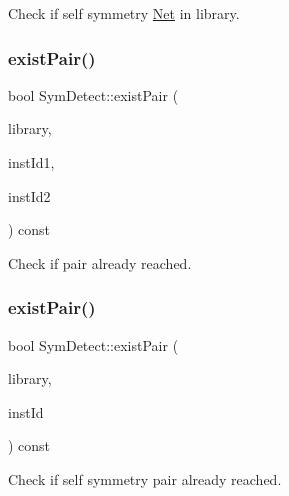 Check if self symmetry \hyperlink{classNet}{Net} in library. 

\mbox{\label{classSymDetect_a245b48760c705d4ad9b2bad39012030e}} 
\subsubsection{\texorpdfstring{exist\+Pair()}{existPair()}\hspace{0.1cm}{\footnotesize\ttfamily [1/2]}}
{\footnotesize\ttfamily bool Sym\+Detect\+::exist\+Pair (\begin{DoxyParamCaption}\item[{std\+::vector$<$ \hyperlink{classMosPair}{Mos\+Pair} $>$ \&}]{library,  }\item[{\hyperlink{type_8h_a581e8093e28e7362f2b6937296190676}{Index\+Type}}]{inst\+Id1,  }\item[{\hyperlink{type_8h_a581e8093e28e7362f2b6937296190676}{Index\+Type}}]{inst\+Id2 }\end{DoxyParamCaption}) const\hspace{0.3cm}{\ttfamily [private]}}



Check if pair already reached. 

\mbox{\label{classSymDetect_a72b24ce0ad3992c207f5023250dd1d5a}} 
\subsubsection{\texorpdfstring{exist\+Pair()}{existPair()}\hspace{0.1cm}{\footnotesize\ttfamily [2/2]}}
{\footnotesize\ttfamily bool Sym\+Detect\+::exist\+Pair (\begin{DoxyParamCaption}\item[{std\+::vector$<$ \hyperlink{classMosPair}{Mos\+Pair} $>$ \&}]{library,  }\item[{\hyperlink{type_8h_a581e8093e28e7362f2b6937296190676}{Index\+Type}}]{inst\+Id }\end{DoxyParamCaption}) const\hspace{0.3cm}{\ttfamily [private]}}

Check if self symmetry pair already reached. \mbox{\label{classSymDetect_a4c50f078fd01ab52e8f50b0507b69556}} 
